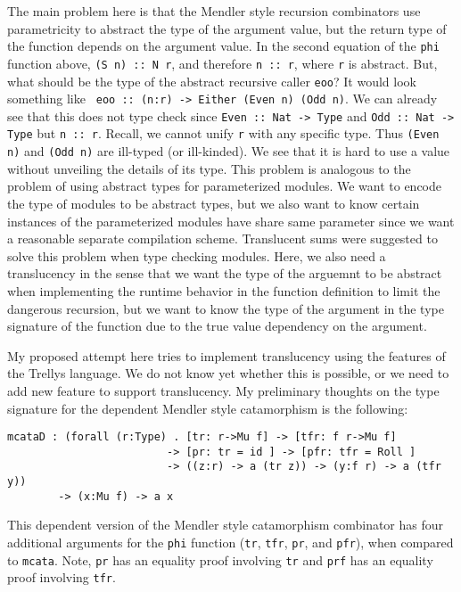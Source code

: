 The main problem here is that the Mendler style recursion combinators
use parametricity to abstract the type of the argument value, but
the return type of the function depends on the argument value.
In the second equation of the \verb|phi| function above,
\verb|(S n) :: N r|, and therefore \verb|n :: r|, where \verb|r|
is abstract. But, what should be the type of the abstract recursive caller
\verb|eoo|? It would look something like \texttt{
eoo :: (n:r) -> Either (Even n) (Odd n)}.
We can already see that this does not type check since
\verb|Even :: Nat -> Type| and \verb|Odd :: Nat -> Type|
but \verb|n :: r|.  Recall, we cannot unify \verb|r| with
any specific type.  Thus \verb|(Even n)| and \verb|(Odd n)|
are ill-typed (or ill-kinded).
We see that it is hard to use a value without unveiling the details of its type.
This problem is analogous to the problem of using abstract types for
parameterized modules. We want to encode the type of modules to be
abstract types, but we also want to know certain instances of
the parameterized modules have share same parameter since we want
a reasonable separate compilation scheme.
Translucent sums \cite{LillibridgeThesis}
were suggested to solve this problem when type checking modules.
Here, we also need a translucency in the sense that we want the type of
the arguemnt to be abstract when implementing the runtime behavior
in the function definition to limit the dangerous recursion, but
we want to know the type of the argument in the type signature of
the function due to the true value dependency on the argument.

My proposed attempt here tries to implement translucency using
the features of the Trellys language. We do not know yet whether
this is possible, or we need to add new feature to support
translucency.  My preliminary thoughts on the type signature
for the dependent Mendler style catamorphism is the following:
\begin{verbatim}
mcataD : (forall (r:Type) . [tr: r->Mu f] -> [tfr: f r->Mu f]
                         -> [pr: tr = id ] -> [pfr: tfr = Roll ]
                         -> ((z:r) -> a (tr z)) -> (y:f r) -> a (tfr y))
        -> (x:Mu f) -> a x
\end{verbatim}
This dependent version of the Mendler style catamorphism combinator
has four additional arguments for the \verb|phi| function
(\verb|tr|, \verb|tfr|, \verb|pr|, and \verb|pfr|),
when compared to \verb|mcata|.
Note, \verb|pr| has an equality proof involving \verb|tr| and
\verb|prf| has an equality proof involving \verb|tfr|.

